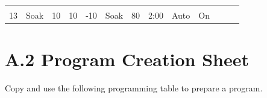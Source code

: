 \begin{longtable}[]{@{}lllllllllllll@{}}
\begin{minipage}[t]{0.08\columnwidth}
\strut
\end{minipage}\tabularnewline
\begin{minipage}[t]{0.06\columnwidth}\raggedright
13\strut
\end{minipage} & \begin{minipage}[t]{0.06\columnwidth}\raggedright
Soak\strut
\end{minipage} & \begin{minipage}[t]{0.05\columnwidth}\raggedright
10\strut
\end{minipage} & \begin{minipage}[t]{0.04\columnwidth}\raggedright
10\strut
\end{minipage} & \begin{minipage}[t]{0.04\columnwidth}\raggedright
-10\strut
\end{minipage} & \begin{minipage}[t]{0.06\columnwidth}\raggedright
Soak\strut
\end{minipage} & \begin{minipage}[t]{0.05\columnwidth}\raggedright
80\strut
\end{minipage} & \begin{minipage}[t]{0.05\columnwidth}\raggedright
2:00\strut
\end{minipage} & \begin{minipage}[t]{0.04\columnwidth}\raggedright
Auto\strut
\end{minipage} & \begin{minipage}[t]{0.03\columnwidth}\raggedright
On\strut
\end{minipage} & \begin{minipage}[t]{0.03\columnwidth}\raggedright
\strut
\end{minipage} & \begin{minipage}[t]{0.07\columnwidth}\raggedright
\strut
\end{minipage} & \begin{minipage}[t]{0.08\columnwidth}\raggedright
\strut
\end{minipage}\tabularnewline
\bottomrule
\end{longtable}


\section{A.2 Program Creation
Sheet}

Copy and use the following programming table to prepare a program.


